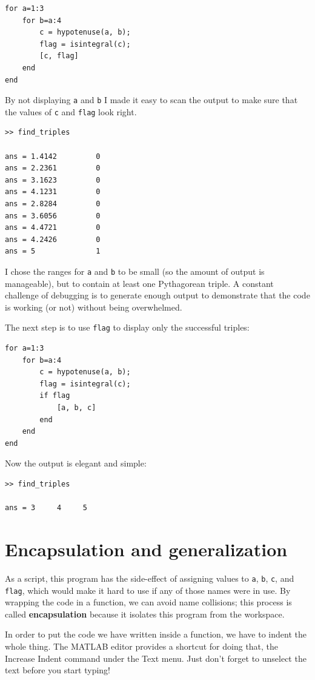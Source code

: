 \documentclass[
]{book}
\begin{document}
\begin{verbatim}
for a=1:3
    for b=a:4
        c = hypotenuse(a, b);
        flag = isintegral(c);
        [c, flag]
    end
end
\end{verbatim}

By not displaying {\tt a} and {\tt b} I made it easy to scan the
output to make sure that the values of {\tt c} and {\tt flag}
look right.

\begin{verbatim}
>> find_triples

ans = 1.4142         0
ans = 2.2361         0
ans = 3.1623         0
ans = 4.1231         0
ans = 2.8284         0
ans = 3.6056         0
ans = 4.4721         0
ans = 4.2426         0
ans = 5              1
\end{verbatim}

I chose the ranges for {\tt a} and {\tt b} to be small
(so the amount of output is manageable), but to contain at
least one Pythagorean triple.  A constant challenge of debugging
is to generate enough output to demonstrate that the code is
working (or not) without being overwhelmed.

The next step is to use {\tt flag} to display only the successful
triples:

\begin{verbatim}
for a=1:3
    for b=a:4
        c = hypotenuse(a, b);
        flag = isintegral(c);
        if flag
            [a, b, c]
        end
    end
end
\end{verbatim}

Now the output is elegant and simple:

\begin{verbatim}
>> find_triples

ans = 3     4     5
\end{verbatim}




\section{Encapsulation and generalization}

As a script, this program has the side-effect of assigning values to
{\tt a}, {\tt b}, {\tt c}, and {\tt flag}, which would make it hard to
use if any of those names were in use.  By wrapping the code in a
function, we can avoid name collisions; this process is called {\bf
encapsulation} because it isolates this program from the workspace.

In order to put the code we have written inside a function, we
have to indent the whole thing.  The MATLAB editor provides a
shortcut for doing that, the {\sf Increase Indent} command
under the {\sf Text} menu.  Just don't forget to unselect the
text before you start typing!
\end{document}
